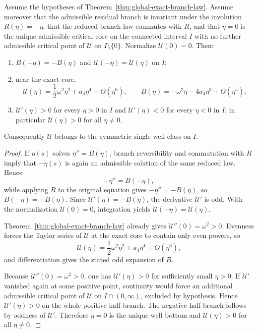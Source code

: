 \begin{theorem}
\label{thm:appendix-single-well-341}
Assume the hypotheses of Theorem~\ref{thm:global-exact-branch-law}. Assume moreover that the admissible residual branch is invariant under the involution $R(\eta)=-\eta$, that the reduced branch law commutes with $R$, and that $\eta=0$ is the unique admissible critical core on the connected interval $I$ with no further admissible critical point of $\mathcal U$ on $I\setminus\{0\}$. Normalize $\mathcal U(0)=0$. Then:
\begin{enumerate}[label=(\roman*)]
  \item $B(-\eta)=-B(\eta)$ and $\mathcal U(-\eta)=\mathcal U(\eta)$ on $I$;
  \item near the exact core,
  \[
    \mathcal U(\eta)=\frac12\omega^2\eta^2+a_4\eta^4+O(\eta^6),
    \qquad
    B(\eta)=-\omega^2\eta-4a_4\eta^3+O(\eta^5);
  \]
  \item $\mathcal U'(\eta)>0$ for every $\eta>0$ in $I$ and $\mathcal U'(\eta)<0$ for every $\eta<0$ in $I$; in particular $\mathcal U(\eta)>0$ for all $\eta\neq0$.
\end{enumerate}
Consequently $\mathcal U$ belongs to the symmetric single-well class on $I$.
\end{theorem}

\begin{proof}
If $\eta(s)$ solves $\eta''=B(\eta)$, branch reversibility and commutation with $R$ imply that $-\eta(s)$ is again an admissible solution of the same reduced law. Hence
\[
  -\eta'' = B(-\eta),
\]
while applying $R$ to the original equation gives $-\eta''=-B(\eta)$, so $B(-\eta)=-B(\eta)$. Since $\mathcal U'(\eta)=-B(\eta)$, the derivative $\mathcal U'$ is odd. With the normalization $\mathcal U(0)=0$, integration yields $\mathcal U(-\eta)=\mathcal U(\eta)$.

Theorem~\ref{thm:global-exact-branch-law} already gives $\mathcal U''(0)=\omega^2>0$. Evenness forces the Taylor series of $\mathcal U$ at the exact core to contain only even powers, so
\[
  \mathcal U(\eta)=\frac12\omega^2\eta^2+a_4\eta^4+O(\eta^6),
\]
and differentiation gives the stated odd expansion of $B$.

Because $\mathcal U''(0)=\omega^2>0$, one has $\mathcal U'(\eta)>0$ for sufficiently small $\eta>0$. If $\mathcal U'$ vanished again at some positive point, continuity would force an additional admissible critical point of $\mathcal U$ on $I\cap(0,\infty)$, excluded by hypothesis. Hence $\mathcal U'(\eta)>0$ on the whole positive half-branch. The negative half-branch follows by oddness of $\mathcal U'$. Therefore $\eta=0$ is the unique well bottom and $\mathcal U(\eta)>0$ for all $\eta\neq0$.
\end{proof}

